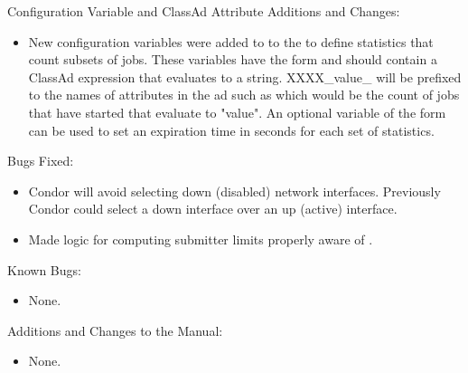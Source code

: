 \noindent Configuration Variable and ClassAd Attribute Additions and Changes:

\begin{itemize}

\item New configuration variables were added to to the  to
define statistics that count subsets of jobs. These variables
have the form  and should contain
a ClassAd expression that evaluates to a string.
XXXX\_value\_ will be prefixed to the names of attributes in the  ad
such as  which would be the count of jobs that have
started that evaluate to "value".  An optional variable of the form
 can be used to set an expiration time in seconds
for each set of statistics.

\end{itemize}

\noindent Bugs Fixed:

\begin{itemize}

\item Condor will avoid selecting down (disabled) network interfaces.  Previously Condor could select a down interface over an up (active) interface.

\item Made  logic for computing submitter limits properly aware of .

\end{itemize}

\noindent Known Bugs:

\begin{itemize}

\item None.

\end{itemize}

\noindent Additions and Changes to the Manual:

\begin{itemize}

\item None.

\end{itemize}



